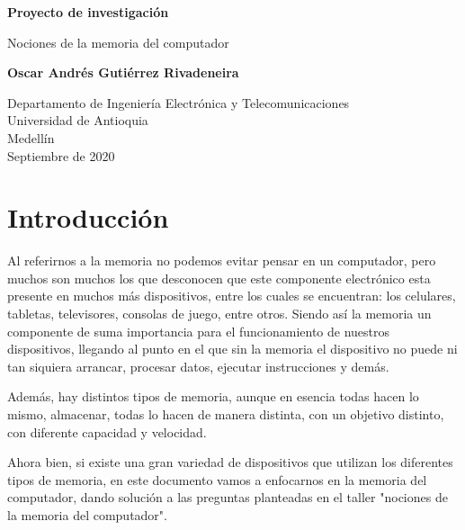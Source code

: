 \documentclass{article}
\begin{document}
\begin{titlepage}
    \begin{center}
        \vspace*{1cm}
            
        \Huge
        \textbf{Proyecto de investigación}
            
        \vspace{0.5cm}
        \LARGE
        Nociones de la memoria del computador
            
        \vspace{1.5cm}
            
        \textbf{Oscar Andrés Gutiérrez Rivadeneira}
            
        \vfill
            
        \vspace{0.8cm}
            
        \Large
        Departamento de Ingeniería Electrónica y Telecomunicaciones\\
        Universidad de Antioquia\\
        Medellín\\
        Septiembre de 2020
            
    \end{center}
\end{titlepage}

\tableofcontents

\newpage

\section{Introducción}
Al referirnos a la memoria no podemos evitar pensar en un computador, pero muchos son muchos los que desconocen que este componente electrónico esta presente en muchos más dispositivos, entre los cuales se encuentran: los celulares, tabletas, televisores, consolas de juego, entre otros. Siendo así la memoria un componente de suma importancia para el funcionamiento de nuestros dispositivos, llegando al punto en el que sin la memoria el dispositivo no puede ni tan siquiera arrancar, procesar datos, ejecutar instrucciones y demás.\cite{tipos-memoria}

Además, hay distintos tipos de memoria, aunque en esencia todas hacen lo mismo, almacenar, todas lo hacen de manera distinta, con un objetivo distinto, con diferente capacidad y velocidad.\hfill
\vspace{4mm}

Ahora bien, si existe una gran variedad de dispositivos que utilizan los diferentes tipos de memoria, en este documento vamos a enfocarnos en la memoria del computador, dando solución a las preguntas planteadas en el taller "nociones de la memoria del computador".
\end{document}
